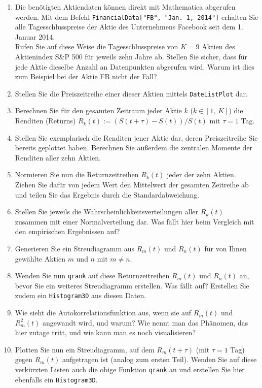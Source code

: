 \documentclass[a4paper,10pt]{article}
\begin{document}
\begin{enumerate}
 \item Die benötigten Aktiendaten können direkt mit Mathematica abgerufen werden. Mit dem Befehl \texttt{FinancialData["FB", "Jan. 1, 2014"]} erhalten Sie alle Tagesschlusspreise der Aktie des Unternehmens Facebook seit dem 1. Januar 2014. \\ Rufen Sie auf diese Weise die Tagesschlusspreise von $K=9$ Aktien des Aktienindex S\&P 500 für jeweils zehn Jahre ab. Stellen Sie sicher, dass für jede Aktie dieselbe Anzahl an Datenpunkten abgerufen wird. Warum ist dies zum Beispiel bei der Aktie FB nicht der Fall?
 \item Stellen Sie die Preiszeitreihe einer dieser Aktien mittels \texttt{DateListPlot} dar.
 \item Berechnen Sie für den gesamten Zeitraum jeder Aktie $k$ ($k\in[1,\,K]$) die Renditen (Returns) $R_k (t):= (S(t+\tau)-S(t))/S(t)$ mit $\tau = 1$ Tag.
 \item Stellen Sie exemplarisch die Renditen jener Aktie dar, deren Preiszeitreihe Sie bereits geplottet haben. Berechnen Sie außerdem die zentralen Momente der Renditen aller zehn Aktien.
 \item Normieren Sie nun die Returnzeitreihen $R_k (t)$ jeder der zehn Aktien. Ziehen Sie dafür von jedem Wert den Mittelwert der gesamten Zeitreihe ab und teilen Sie das Ergebnis durch die Standardabweichung.
 \item Stellen Sie jeweils die Wahrscheinlichkeitsverteilungen aller $R_k (t)$ zusammen mit einer Normalverteilung dar. Was fällt hier beim Vergleich mit den empirischen Ergebnissen auf?
 \item Generieren Sie ein Streudiagramm aus $R_m (t)$ und $R_n (t)$ für von Ihnen gewählte Aktien $m$ und $n$ mit $m \neq n$.
 \item Wenden Sie nun \texttt{qrank} auf diese Returnzeitreihen $R_m (t)$ und $R_n (t)$ an, bevor Sie ein weiteres Streudiagramm erstellen. Was fällt auf? Erstellen Sie zudem ein \texttt{Histogram3D} aus diesen Daten.
 \item Wie sieht die Autokorrelationsfunktion aus, wenn sie auf $R_m (t)$ und $R^2_m (t)$ angewandt wird, und warum? Wie nennt man das Phänomen, das hier zutage tritt, und wie kann man es noch visualisieren?
 \item Plotten Sie nun ein Streudiagramm, auf dem $R_m (t + \tau)$ (mit $\tau = 1$ Tag) gegen $R_m (t)$ aufgetragen ist (analog zum ersten Teil). Wenden Sie auf diese verkürzten Listen auch die obige Funktion \texttt{qrank} an und erstellen Sie hier ebenfalls ein \texttt{Histogram3D}.
\end{enumerate}
\end{document}
